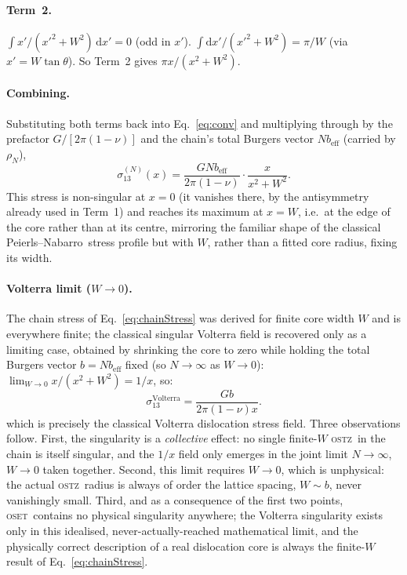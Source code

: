 \documentclass[5p,sort&compress]{elsarticle}
\newcommand{\OSTZ}{\textsc{ostz}}
\newcommand{\OSET}{\textsc{oset}}
\newcommand{\beff}{b_\mathrm{eff}}
\newcommand{\PN}{Peierls--Nabarro}
\begin{document}
\paragraph{Term~2.}
$\int x'/(x'^2+W^2)\,\mathrm dx'=0$ (odd in $x'$).
$\int\mathrm dx'/(x'^2+W^2)=\pi/W$
(via $x'=W\tan\theta$).
So Term~2 gives $\pi x/(x^2+W^2)$.

\paragraph{Combining.}
Substituting both terms back into Eq.~\eqref{eq:conv} and
multiplying through by the prefactor $G/[2\pi(1-\nu)]$ and the
chain's total Burgers vector $N\beff$ (carried by $\rho_N$),
\begin{equation}
  \boxed{\sigma_{13}^{(N)}(x)=\frac{GN\beff}{2\pi(1-\nu)}
  \cdot\frac{x}{x^2+W^2}.}
  \label{eq:chainStress}
\end{equation}
This stress is non-singular at $x=0$ (it vanishes there, by the
antisymmetry already used in Term~1) and reaches its maximum at
$x=W$, i.e.\ at the edge of the core rather than at its centre,
mirroring the familiar shape of the classical \PN\ stress profile
but with $W$, rather than a fitted core radius, fixing its width.

\paragraph{Volterra limit ($W\to0$).}
The chain stress of Eq.~\eqref{eq:chainStress} was derived for finite
core width $W$ and is everywhere finite; the classical singular
Volterra field is recovered only as a limiting case, obtained by
shrinking the core to zero while holding the total Burgers vector
$b=N\beff$ fixed (so $N\to\infty$ as $W\to0$):
$\lim_{W\to0}x/(x^2+W^2)=1/x$, so:
\begin{equation}
  \sigma_{13}^\text{Volterra}=\frac{Gb}{2\pi(1-\nu)x}.
  \label{eq:volterra}
\end{equation}
which is precisely the classical Volterra dislocation stress field.
Three observations follow. First, the singularity is a
\emph{collective} effect: no single finite-$W$ \OSTZ\ in the chain is
itself singular, and the $1/x$ field only emerges in the joint limit
$N\to\infty$, $W\to0$ taken together. Second, this limit requires
$W\to0$, which is unphysical: the actual \OSTZ\ radius is always of
order the lattice spacing, $W\sim b$, never vanishingly small. Third,
and as a consequence of the first two points, \OSET\ contains no
physical singularity anywhere; the Volterra singularity exists only
in this idealised, never-actually-reached mathematical limit, and
the physically correct description of a real dislocation core is
always the finite-$W$ result of Eq.~\eqref{eq:chainStress}.
\end{document}
